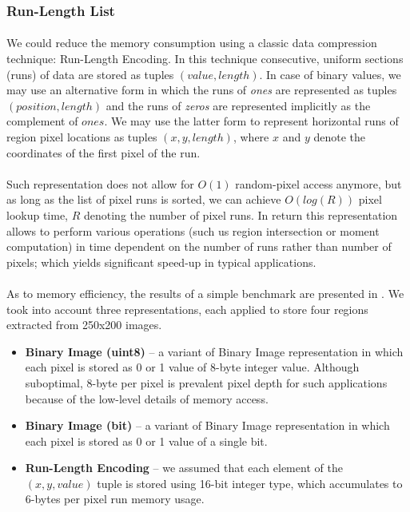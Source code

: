 \subsubsection{Run-Length List}

\paragraph*{}
We could reduce the memory consumption using a classic data compression technique: Run-Length Encoding. In this technique consecutive, uniform sections (runs) of data are stored as tuples $(value, length)$. In case of binary values, we may use an alternative form in which the runs of \textit{ones} are represented as tuples $(position, length)$ and the runs of \textit{zeros} are represented implicitly as the complement of $ones$. We may use the latter form to represent horizontal runs of region pixel locations as tuples $(x, y, length)$, where $x$ and $y$ denote the coordinates of the first pixel of the run. 

\paragraph*{}
Such representation does not allow for $O(1)$ random-pixel access anymore, but as long as the list of pixel runs is sorted, we can achieve $O(log(R))$ pixel lookup time, $R$ denoting the number of pixel runs. In return this representation allows to perform various operations (such us region intersection or moment computation) in time dependent on the number of runs rather than number of pixels; which yields significant speed-up in typical applications.

\paragraph*{}
As to memory efficiency, the results of a simple benchmark are presented in . We took into account three representations, each applied to store four regions extracted from 250x200 images.

\begin{itemize}
	\item \textbf{Binary Image (uint8)} -- a variant of Binary Image representation in which each pixel is stored as 0 or 1 value of 8-byte integer value. Although suboptimal, 8-byte per pixel is prevalent pixel depth for such applications because of the low-level details of memory access.
	\item \textbf{Binary Image (bit)} -- a variant of Binary Image representation in which each pixel is stored as 0 or 1 value of a single bit.
	\item \textbf{Run-Length Encoding} -- we assumed that each element of the $(x, y, value)$ tuple is stored using 16-bit integer type, which accumulates to 6-bytes per pixel run memory usage.
\end{itemize}


